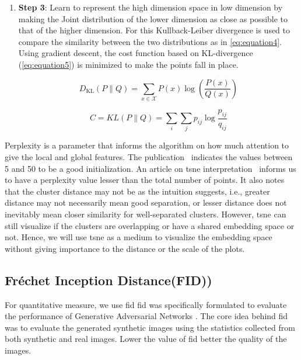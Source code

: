 \begin{enumerate}
    \item \textbf{Step 3}: Learn to represent the high dimension space in low dimension by making the Joint distribution of the lower dimension as close as possible to that of the higher dimension.
    For this Kullback-Leiber divergence\cite{Joyce2011} is used to compare the similarity between the two distributions as in \autoref{eq:equation4}.
    Using gradient descent, the cost function based on KL-divergence (\autoref{eq:equation5}) is minimized to make the points fall in place.

    \begin{equation}
        D_{\mathrm{KL}}(P \| Q)=\sum_{x \in \mathcal{X}} P(x) \log \left(\frac{P(x)}{Q(x)}\right)
        \label{eq:equation4}
    \end{equation}

    \begin{equation}
        C=K L(P \| Q)=\sum_{i} \sum_{j} p_{i j} \log \frac{p_{i j}}{q_{i j}}
        \label{eq:equation5}
    \end{equation}
\end{enumerate}

Perplexity is a parameter that informs the algorithm on how much attention to give the local and global features.
The publication~\cite{vanDerMaaten2008} indicates the values between 5 and 50 to be a good initialization.
An article on \gls{tsne} interpretation~\cite{wattenberg2016how} informs us to have a perplexity value lesser than the total number of points.
It also notes that the cluster distance may not be as the intuition suggests, i.e., greater distance may not necessarily mean good separation, or lesser distance does not inevitably mean closer similarity for well-separated clusters.
However, \gls{tsne} can still visualize if the clusters are overlapping or have a shared embedding space or not.
Hence, we will use \gls{tsne} as a medium to visualize the embedding space without giving importance to the distance or the scale of the plots.

\subsection{Fr\'echet Inception Distance(FID))}\label{subsec:fr'echet-inception-distance)}
For quantitative measure, we use \gls{fid}
\gls{fid} \cite{Heusel2017GANsTB} was specifically formulated to evaluate the performance of Generative Adversarial Networks \cite{Goodfellow2014}.
The core idea behind \gls{fid} was to evaluate the generated synthetic images using the statistics collected from both synthetic and real images.
Lower the value of \gls{fid} better the quality of the images.


